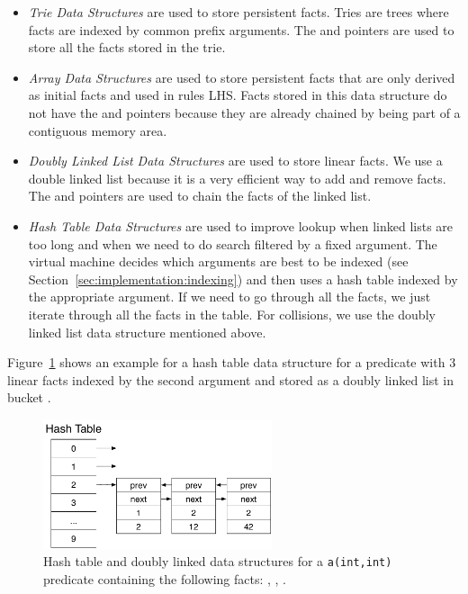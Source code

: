\begin{itemize}

\item \emph{Trie Data Structures} are used to store persistent facts. Tries are
   trees where facts are indexed by common prefix arguments. The 
   and  pointers are used to store all the facts stored in the trie.

\item \emph{Array Data Structures} are used to store persistent facts that are
   only derived as initial facts and used in rules LHS. Facts stored in this
   data structure do not have the  and  pointers
   because they are already chained by being part of a contiguous memory area.

\item \emph{Doubly Linked List Data Structures} are used to store linear facts.
   We use a double linked list because it is a very efficient way to add and
   remove facts. The  and  pointers are used to chain
   the facts of the linked list.

\item \emph{Hash Table Data Structures} are used to improve lookup when linked
   lists are too long and when we need to do search filtered by a fixed
   argument. The virtual machine decides which arguments are best to be indexed
   (see Section~\ref{sec:implementation:indexing}) and then uses a hash table
   indexed by the appropriate argument. If we need to go through all the facts,
   we just iterate through all the facts in the table. For collisions, we use
   the doubly linked list data structure mentioned above.

\end{itemize}

Figure~\ref{fig:implementation:hash_table} shows an example for a hash table
data structure for a  predicate with 3 linear facts indexed
by the second argument and stored as a doubly linked list in bucket .

\begin{figure}[ht]
\centering
\includegraphics[width=0.6\textwidth]{figures/implementation/hash_table.pdf}
\caption{Hash table and doubly linked data structures for 
   a \texttt{a(int,int)} predicate containing the following facts: , , .}
\label{fig:implementation:hash_table}
\end{figure}

